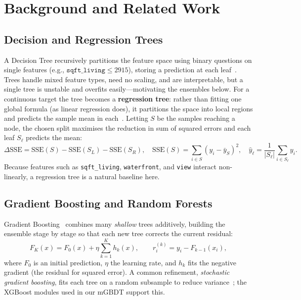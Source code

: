 \section{Background and Related Work}
\label{sec:background}

\subsection{Decision and Regression Trees}

A Decision Tree recursively partitions the feature space using binary questions
on single features (e.g., $\texttt{sqft\_living} \leq 2915$), storing a
prediction at each leaf~\cite{breiman1984cart}. Trees handle mixed feature
types, need no scaling, and are interpretable, but a single tree is unstable and
overfits easily---motivating the ensembles below. For a continuous target the
tree becomes a \textbf{regression tree}: rather than fitting one global formula
(as linear regression does), it partitions the space into local regions and
predicts the sample mean in each~\cite{hastie2009elements}. Letting $S$ be the
samples reaching a node, the chosen split maximises the reduction in sum of
squared errors and each leaf $S_{\ell}$ predicts the mean:
\begin{equation}
  \Delta\text{SSE} = \text{SSE}(S) - \text{SSE}(S_L) - \text{SSE}(S_R),
  \quad \text{SSE}(S) = \sum_{i \in S}(y_i - \bar{y}_S)^2,
  \quad \hat{y}_{\ell} = \frac{1}{|S_{\ell}|}\sum_{i \in S_{\ell}} y_i.
\end{equation}
Because features such as \texttt{sqft\_living}, \texttt{waterfront}, and
\texttt{view} interact non-linearly, a regression tree is a natural baseline here.

\subsection{Gradient Boosting and Random Forests}

Gradient Boosting~\cite{friedman2001greedy} combines many \emph{shallow} trees
additively, building the ensemble stage by stage so that each new tree corrects
the current residual:
\begin{equation}
  F_K(x) = F_0(x) + \eta\sum_{k=1}^{K} h_k(x),
  \qquad r_i^{(k)} = y_i - F_{k-1}(x_i),
\end{equation}
where $F_0$ is an initial prediction, $\eta$ the learning rate, and $h_k$ fits
the negative gradient (the residual for squared error). A common refinement,
\emph{stochastic gradient boosting}, fits each tree on a random
subsample to reduce variance~\cite{friedman2002stochastic}; the XGBoost modules
used in our mGBDT support this.

